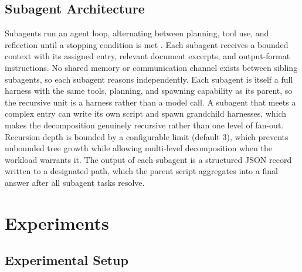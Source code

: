\documentclass[sigconf,nonacm]{acmart}
\begin{document}
\subsection{Subagent Architecture}
\label{subsec:subagent}
Subagents run an agent loop, alternating between planning, tool use, and reflection until a stopping condition is met \cite{wei2022cot,yao2023tot}.
Each subagent receives a bounded context with its assigned entry, relevant document excerpts, and output-format instructions. No shared memory or communication channel exists between sibling subagents, so each subagent reasons independently.
Each subagent is itself a full harness with the same tools, planning, and spawning capability as its parent, so the recursive unit is a harness rather than a model call. A subagent that meets a complex entry can write its own script and spawn grandchild harnesses, which makes the decomposition genuinely recursive rather than one level of fan-out.
Recursion depth is bounded by a configurable limit (default 3), which prevents unbounded tree growth while allowing multi-level decomposition when the workload warrants it.
The output of each subagent is a structured JSON record written to a designated path, which the parent script aggregates into a final answer after all subagent tasks resolve.


\section{Experiments}
\label{sec:experiments}

\subsection{Experimental Setup}
\end{document}

